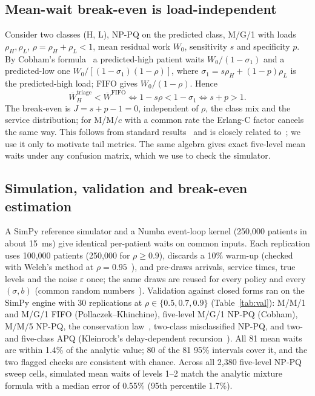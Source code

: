 \documentclass[conference]{IEEEtran}
\begin{document}
\subsection{Mean-wait break-even is load-independent}\label{sec:prop}
Consider two classes (H, L), NP-PQ on the predicted class, M/G/1 with loads
$\rho_H,\rho_L$, $\rho=\rho_H+\rho_L<1$, mean residual work $W_0$, sensitivity $s$ and
specificity $p$. By Cobham's formula~\cite{cobham1954priority} a predicted-high patient
waits $W_0/(1-\sigma_1)$ and a predicted-low one $W_0/[(1-\sigma_1)(1-\rho)]$, where
$\sigma_1=s\rho_H+(1-p)\rho_L$ is the predicted-high load; FIFO gives $W_0/(1-\rho)$. Hence
\begin{equation}
\overline W_H^{\text{triage}}<\overline W^{\text{FIFO}}\iff 1-s\rho<1-\sigma_1
\iff s+p>1 .
\end{equation}
The break-even is $J=s+p-1=0$, independent of $\rho$, the class mix and the service
distribution; for M/M/$c$ with a common rate the Erlang-C factor cancels the same way.
This follows from standard results~\cite{cobham1954priority,kleinrock1965conservation}
and is closely related to~\cite{argon2009priority}; we use it only to motivate tail
metrics. The same algebra gives exact five-level mean waits under any confusion matrix,
which we use to check the simulator.

\subsection{Simulation, validation and break-even estimation}
A SimPy reference simulator and a Numba event-loop kernel (250,000 patients in about
15~ms) give identical per-patient waits on common inputs. Each replication uses 100,000
patients (250,000 for $\rho\ge0.9$), discards a 10\% warm-up (checked with Welch's
method at $\rho=0.95$~\cite{welch1983}), and pre-draws arrivals, service times, true
levels and the noise $\varepsilon$ once; the same draws are reused for every policy and
every $(\sigma,b)$ (common random numbers~\cite{law2015simulation}). Validation against
closed forms ran on the SimPy engine with 30 replications at $\rho\in\{0.5,0.7,0.9\}$
(Table~\ref{tab:val}): M/M/1 and M/G/1 FIFO (Pollaczek--Khinchine), five-level M/G/1
NP-PQ (Cobham), M/M/5 NP-PQ, the conservation law~\cite{kleinrock1965conservation},
two-class misclassified NP-PQ, and two- and five-class APQ
(Kleinrock's delay-dependent recursion~\cite{kleinrock1964delay}). All 81 mean waits
are within 1.4\% of the analytic value; 80 of the 81 95\% intervals cover it, and the
two flagged checks are consistent with chance. Across all 2,380 five-level NP-PQ sweep
cells, simulated mean waits of levels 1--2 match the analytic mixture formula with a
median error of 0.55\% (95th percentile 1.7\%).
\end{document}
